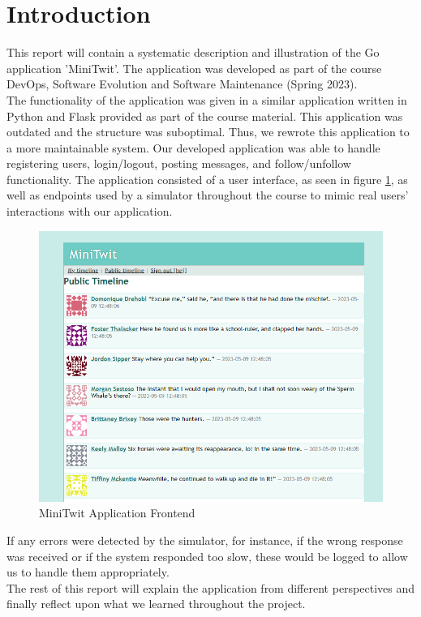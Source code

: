 \section{Introduction}
This report will contain a systematic description and illustration of the Go application 
'MiniTwit'. The application was developed as part of the course 
DevOps, Software Evolution and Software Maintenance (Spring 2023). \\

The functionality of the application was
given in a similar application written in Python and Flask provided as part of the course material. This
application was outdated and the structure was suboptimal. Thus, we rewrote this application to a more 
maintainable system. Our developed application was able to handle registering users, login/logout, 
posting messages, and follow/unfollow functionality. The application consisted of a user interface, 
as seen in figure \ref{fig:minitwit}, as well as endpoints used by a simulator throughout the course to 
mimic real users' interactions with our application.

\begin{figure}[H]
    \centering
    \captionsetup{justification=centering,margin=1cm}
    \includegraphics[width=0.8\linewidth]{report/images/minitwit.png}
    \caption{MiniTwit Application Frontend}
    \label{fig:minitwit}
\end{figure}

If any errors were detected by the simulator, for instance, if the wrong response was received or if the system
responded too slow, these would be logged to allow us to handle them appropriately.\\

The rest of this report will explain the application from different perspectives and finally reflect upon
what we learned throughout the project.

